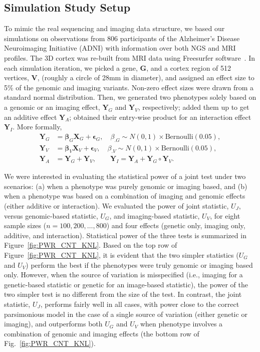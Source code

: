 \documentclass[11pt]{article}
\newcommand{\bs}{\boldsymbol}
\begin{document}
\subsection*{Simulation Study Setup}
To mimic the real sequencing and imaging data structure, we based our simulations on observations from 806 participants of the Alzheimer's Disease Neuroimaging Initiative (ADNI) \citep{ADNI05, ADNI10} with information over both NGS and MRI profiles. The 3D cortex was re-built from MRI data using Freesurfer software~\citep{FS:Intro}. In each simulation iteration, we picked a gene, $\bs{G}$, and a cortex region of 512 vertices, $\bs{V}$, (roughly a circle of 28mm in diameter), and assigned an effect size to 5\% of the genomic and imaging variants. Non-zero effect sizes were drawn from a standard normal distribution. Then, we generated two phenotypes solely based on a genomic or an imaging effect, $\bs{Y}_G$ and $\bs{Y}_V$, respectively; added them up to get an additive effect $\bs{Y}_A$; obtained their entry-wise product for an interaction effect $\bs{Y}_I$. More formally, 
\begin{equation}\label{eq:SM1}
  \begin{split}
    \bs{Y}_G &= \bs{\beta}_G \bs{X}_G + \bs{\epsilon}_G, \quad \beta_{.G} \sim N(0,1) \times \text{Bernoulli}(0.05), \\
    \bs{Y}_V &= \bs{\beta}_V \bs{X}_V + \bs{\epsilon}_V, \quad \beta_{.V} \sim N(0,1) \times \text{Bernoulli}(0.05), \\
    \bs{Y}_A &= \bs{Y}_G + \bs{Y}_V, \qquad \bs{Y}_I = \bs{Y}_A + \bs{Y}_G \circ \bs{Y}_V.
  \end{split}
\end{equation}

We were interested in evaluating the statistical power of a joint test under two scenarios: (a)  when a phenotype was purely genomic or imaging based, and (b) when a phenotype was based on a combination of imaging and genomic effects (either additive or interaction). We evaluated the power of joint statistic, $U_J$, versus genomic-based statistic, $U_G$, and imaging-based statistic, $U_V$, for eight sample sizes ($n = 100, 200, \ldots, 800$) and four effects (genetic only, imaging only, additive, and interaction). Statistical power of the three tests is summarized in Figure~\ref{fig:PWR_CNT_KNL}. Based on the top row of Figure~\ref{fig:PWR_CNT_KNL}, it is evident that the two simpler statistics ($U_G$ and $U_V$) perform the best if the phenotypes were truly genomic or imaging based only. However, when the source of variation is misspecified (i.e., imaging for a genetic-based statistic or genetic for an image-based statistic), the power of the two simpler test is no different from the size of the test. In contrast, the joint statistic, $U_J$, performs fairly well in all cases, with power close to the correct parsimonious model in the case of a single source of variation (either genetic or imaging), and outperforms both $U_G$ and $U_V$ when phenotype involves a combination of genomic and imaging effects (the bottom row of Fig.~\ref{fig:PWR_CNT_KNL}).
\end{document}

